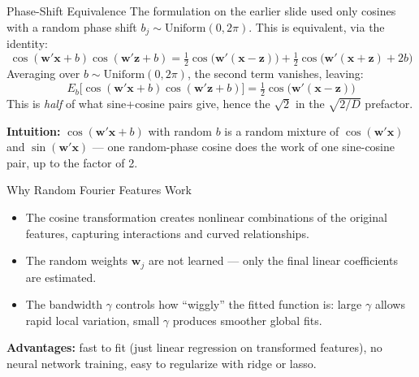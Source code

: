 \documentclass[aspectratio=169,t]{beamer}
\begin{document}
\begin{frame}{Phase-Shift Equivalence}
The formulation on the earlier slide used only cosines with a random phase shift $b_j \sim \text{Uniform}(0, 2\pi)$.  This is equivalent, via the identity:
\[
\cos(\mathbf{w}'\mathbf{x} + b)\cos(\mathbf{w}'\mathbf{z} + b) = \tfrac{1}{2}\cos\!\bigl(\mathbf{w}'(\mathbf{x}-\mathbf{z})\bigr) + \tfrac{1}{2}\cos\!\bigl(\mathbf{w}'(\mathbf{x}+\mathbf{z}) + 2b\bigr)
\]
Averaging over $b \sim \text{Uniform}(0,2\pi)$, the second term vanishes, leaving:
\[
E_b\bigl[\cos(\mathbf{w}'\mathbf{x}+b)\cos(\mathbf{w}'\mathbf{z}+b)\bigr] = \tfrac{1}{2}\cos\!\bigl(\mathbf{w}'(\mathbf{x}-\mathbf{z})\bigr)
\]
This is \emph{half} of what sine+cosine pairs give, hence the $\sqrt{2}$ in the $\sqrt{2/D}$ prefactor.

\vspace{0.3cm}
\textbf{Intuition:} $\cos(\mathbf{w}'\mathbf{x} + b)$ with random $b$ is a random mixture of $\cos(\mathbf{w}'\mathbf{x})$ and $\sin(\mathbf{w}'\mathbf{x})$ --- one random-phase cosine does the work of one sine-cosine pair, up to the factor of 2.
\end{frame}

\begin{frame}{Why Random Fourier Features Work}
\begin{itemize}
\item The cosine transformation creates \alert{nonlinear combinations} of the original features, capturing interactions and curved relationships.
\item The random weights $\mathbf{w}_j$ are not learned --- only the final linear coefficients are estimated.
\item The bandwidth $\gamma$ controls how ``wiggly'' the fitted function is: large $\gamma$ allows rapid local variation, small $\gamma$ produces smoother global fits.
\end{itemize}

\vspace{0.3cm}
\textbf{Advantages:} fast to fit (just linear regression on transformed features), no neural network training, easy to regularize with ridge or lasso.
\end{frame}

\end{document}
